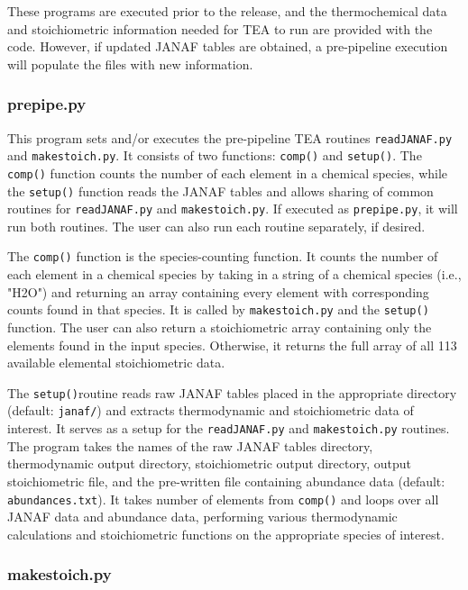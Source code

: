 These programs are executed prior to the release, and the
thermochemical data and stoichiometric information needed for TEA to
run are provided with the code. However, if updated JANAF tables are
obtained, a pre-pipeline execution will populate the files with new
information.


\subsubsection{prepipe.py}

This program sets and/or executes the pre-pipeline TEA
routines \texttt{readJANAF.py} and \newline \texttt{makestoich.py}. It
consists of two functions: \texttt{comp()} and \texttt{setup()}. The
\texttt{comp()} function counts the number of each element in a
 chemical species, while the \texttt{setup()} function reads the JANAF
tables and allows sharing of common routines for \texttt{readJANAF.py}
and \texttt{makestoich.py}. If executed as \texttt{prepipe.py}, it
will run both routines. The user can also run each routine separately,
if desired.

The \texttt{comp()} function is the species-counting function. It
counts the number of each element in a chemical species by taking in a
string of a chemical species (i.e., "H2O") and returning an array
containing every element with corresponding counts found in that
species. It is called by \texttt{makestoich.py} and
the \texttt{setup()} function. The user can also return a
stoichiometric array containing only the elements found in the input
species. Otherwise, it returns the full array of all 113 available
elemental stoichiometric data.

The \texttt{setup()}routine reads raw JANAF tables placed in the
appropriate directory (default: \texttt{janaf/}) and extracts
thermodynamic and stoichiometric data of interest. It serves as a
setup for the \texttt{readJANAF.py} and \texttt{makestoich.py}
routines. The program takes the names of the raw JANAF tables
directory, thermodynamic output directory, stoichiometric output
directory, output stoichiometric file, and the pre-written file
containing abundance data \newline
(default: \texttt{abundances.txt}). It takes number of elements
from \texttt{comp()} and loops over all JANAF data and abundance data,
performing various thermodynamic calculations and stoichiometric
functions on the appropriate species of interest.


\subsubsection{makestoich.py}

